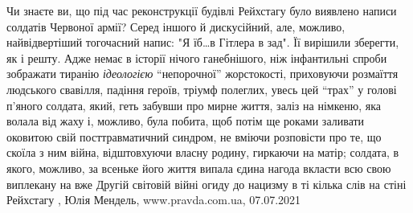Чи знаєте ви, що під час реконструкції будівлі Рейхстагу було виявлено написи
солдатів Червоної армії? Серед іншого й дискусійний, але, можливо,
найвідвертіший тогочасний напис: "Я їб…в Гітлера в зад". Її вирішили зберегти,
як і решту.  Адже немає в історії нічого ганебнішого, ніж інфантильні спроби
зображати тиранію \emph{ідеологією} \enquote{непорочної} жорстокості,
приховуючи розмаїття людського свавілля, падіння героїв, тріумф полеглих, увесь
цей \enquote{трах} у голові п’яного солдата, який, геть забувши про мирне
життя, заліз на німкеню, яка волала від жаху і, можливо, була побита, щоб потім
ще роками заливати оковитою свій посттравматичний синдром, не вміючи розповісти
про те, що скоїла з ним війна, відштовхуючи власну родину, гиркаючи на матір;
солдата, в якого, можливо, за всеньке його життя випала єдина нагода вкласти
всю свою виплекану на вже Другій світовій війні огиду до нацизму в ті кілька
слів на стіні Рейхстагу
, 
Юлія Мендель, www.pravda.com.ua, 07.07.2021
